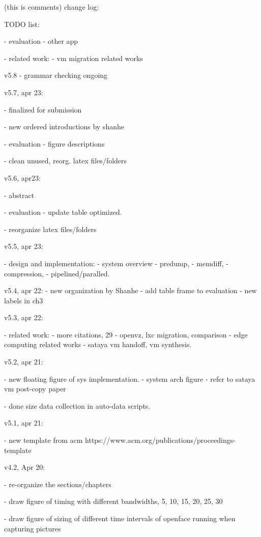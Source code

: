 
\iffalse
(this is comments) change log:

TODO list:

 - evaluation
     - other app
 
 - related work:
    - vm migration related works

v5.8
 - grammar checking ongoing
 
v5.7, apr 23:

 - finalized for submission

 - new ordered introductions by shanhe
 
 - evaluation
     - figure descriptions
     
 - clean unused, reorg. latex files/folders
 
    
v5.6, apr23:
    
 - abstract
 
 - evaluation
     - update table optimized.
     
 - reorganize latex files/folders

v5.5, apr 23:

    - design and implementation:
        - system overview
        - predump, 
        - memdiff, 
        - compression, 
        - pipelined/paralled.

v5.4, apr 22:
    - new organization by Shanhe
    - add table frame to evaluation
    - new labels in ch3
    
v5.3, apr 22:

 - related work:
    - more citations, 29
    - openvz, lxc migration, comparison
    - edge computing related works
    - sataya vm handoff, vm synthesis. 
    


v5.2, apr 21:

 - new floating figure of sys implementation.
    - system arch figure
    - refer to sataya vm post-copy paper
    
 - done size data collection in auto-data scripts.

v5.1, apr 21:

 - new template from acm
    https://www.acm.org/publications/proceedings-template
 
v4.2, Apr 20: 

 - re-organize the sections/chapters
 
 - draw figure of timing with different bandwidths, 5, 10, 15, 20, 25, 30
 
 - draw figure of sizing of different time intervals of openface running when capturing pictures
 
